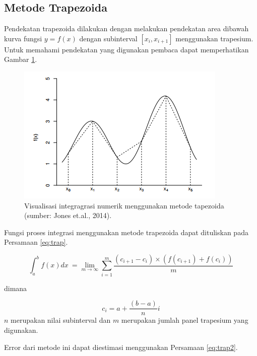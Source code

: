 \documentclass[]{book}
\theoremstyle{definition}
\theoremstyle{definition}
\theoremstyle{definition}
\theoremstyle{remark}
\begin{document}
\hypertarget{trapezoida}{%
\subsection{Metode Trapezoida}\label{trapezoida}}

Pendekatan trapezoida dilakukan dengan melakukan pendekatan area dibawah kurva fungsi \(y=f\left(x\right)\) dengan subinterval \(\left[x_i,x_{i+1}\right]\) menggunakan trapesium. Untuk memahami pendekatan yang digunakan pembaca dapat memperhatikan Gambar \ref{fig:trapviz}.

\begin{figure}

{\centering \includegraphics[width=0.9\linewidth]{./images/trapviz} 

}

\caption{Visualisasi integragrasi numerik menggunakan metode tapezoida (sumber: Jones et.al., 2014).}\label{fig:trapviz}
\end{figure}

Fungsi proses integrasi menggunakan metode trapezoida dapat dituliskan pada Persamaan \eqref{eq:trap}.

\begin{equation}
\int_a^bf\left(x\right)dx\ = \lim\limits_{m \to \infty} \sum_{i=1}^m\frac{\left(c_{i+1}-c_i\right)\times\left(f\left(c_{i+1}\right)+f\left(c_i\right)\right)}{m}
  \label{eq:trap}
\end{equation}

dimana

\[
c_i=a+\frac{\left(b-a\right)}{n}i
\]
\(n\) merupakan nilai subinterval dan \(m\) merupakan jumlah panel trapesium yang digunakan.

Error dari metode ini dapat diestimasi menggunakan Persamaan \eqref{eq:trap2}.
\end{document}
